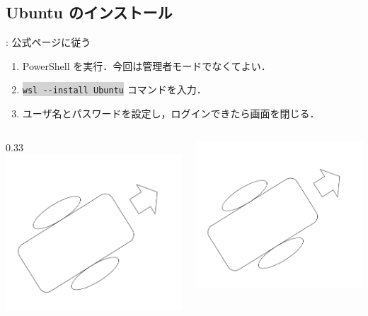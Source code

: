\documentclass[aspectratio=169,dvipdfmx,cjk]{beamer}
\newcommand{\cmdline}[1]{
    \colorbox{lightgray}{\lstinline[style=command]{#1}}
}
\begin{document}
\subsection{Ubuntu のインストール}
\begin{frame}{\insertsection \thesubsection: \insertsubsection}
  公式ページ\cite{WSL}に従う
  \begin{enumerate}
    \item PowerShell を実行．今回は管理者モードでなくてよい．
    \item \cmdline{wsl --install Ubuntu} コマンドを入力．
    \item ユーザ名とパスワードを設定し，ログインできたら画面を閉じる．
  \end{enumerate}
  \begin{columns}
    \begin{column}{0.33\textwidth}
        \includegraphics[width=1.0\linewidth]{fig/robot.png}
    \end{column}
    \begin{column}{0.33\textwidth}
      \includegraphics[width=1.0\linewidth]{fig/robot.png}

\end{column}
\end{columns}
\end{frame}
\end{document}
